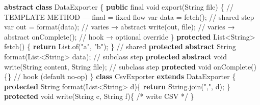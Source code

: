 \documentclass[11pt]{article}
\newenvironment{Shaded}{\begin{snugshade}}{\end{snugshade}}
\newcommand{\BuiltInTok}[1]{\textcolor[rgb]{0.50,0.55,0.55}{#1}}
\newcommand{\CommentTok}[1]{\textcolor[rgb]{0.48,0.49,0.49}{#1}}
\newcommand{\ControlFlowTok}[1]{\textcolor[rgb]{0.99,0.74,0.29}{\textbf{#1}}}
\newcommand{\DataTypeTok}[1]{\textcolor[rgb]{0.16,0.50,0.73}{#1}}
\newcommand{\FunctionTok}[1]{\textcolor[rgb]{0.56,0.27,0.68}{#1}}
\newcommand{\KeywordTok}[1]{\textcolor[rgb]{0.81,0.81,0.76}{\textbf{#1}}}
\newcommand{\NormalTok}[1]{\textcolor[rgb]{0.81,0.81,0.76}{#1}}
\newcommand{\OperatorTok}[1]{\textcolor[rgb]{0.81,0.81,0.76}{#1}}
\newcommand{\StringTok}[1]{\textcolor[rgb]{0.96,0.31,0.31}{#1}}
\begin{document}
\begin{Shaded}
\begin{Highlighting}[]
\KeywordTok{abstract} \KeywordTok{class}\NormalTok{ DataExporter }\OperatorTok{\{}
    \KeywordTok{public} \DataTypeTok{final} \DataTypeTok{void} \FunctionTok{export}\OperatorTok{(}\BuiltInTok{String}\NormalTok{ file}\OperatorTok{)} \OperatorTok{\{}     \CommentTok{// TEMPLATE METHOD — final = fixed flow}
        \DataTypeTok{var}\NormalTok{ data }\OperatorTok{=} \FunctionTok{fetch}\OperatorTok{();}      \CommentTok{// shared step}
        \DataTypeTok{var}\NormalTok{ out  }\OperatorTok{=} \FunctionTok{format}\OperatorTok{(}\NormalTok{data}\OperatorTok{);} \CommentTok{// varies  → abstract}
        \FunctionTok{write}\OperatorTok{(}\NormalTok{out}\OperatorTok{,}\NormalTok{ file}\OperatorTok{);}        \CommentTok{// varies  → abstract}
        \FunctionTok{onComplete}\OperatorTok{();}            \CommentTok{// hook    → optional override}
    \OperatorTok{\}}
    \KeywordTok{protected} \BuiltInTok{List}\OperatorTok{\textless{}}\BuiltInTok{String}\OperatorTok{\textgreater{}} \FunctionTok{fetch}\OperatorTok{()} \OperatorTok{\{} \ControlFlowTok{return} \BuiltInTok{List}\OperatorTok{.}\FunctionTok{of}\OperatorTok{(}\StringTok{"a"}\OperatorTok{,} \StringTok{"b"}\OperatorTok{);} \OperatorTok{\}}   \CommentTok{// shared}
    \KeywordTok{protected} \KeywordTok{abstract} \BuiltInTok{String} \FunctionTok{format}\OperatorTok{(}\BuiltInTok{List}\OperatorTok{\textless{}}\BuiltInTok{String}\OperatorTok{\textgreater{}}\NormalTok{ data}\OperatorTok{);}          \CommentTok{// subclass step}
    \KeywordTok{protected} \KeywordTok{abstract} \DataTypeTok{void}   \FunctionTok{write}\OperatorTok{(}\BuiltInTok{String}\NormalTok{ content}\OperatorTok{,} \BuiltInTok{String}\NormalTok{ file}\OperatorTok{);} \CommentTok{// subclass step}
    \KeywordTok{protected} \DataTypeTok{void} \FunctionTok{onComplete}\OperatorTok{()} \OperatorTok{\{\}}                                 \CommentTok{// hook (default no{-}op)}
\OperatorTok{\}}
\KeywordTok{class}\NormalTok{ CsvExporter }\KeywordTok{extends}\NormalTok{ DataExporter }\OperatorTok{\{}
    \KeywordTok{protected} \BuiltInTok{String} \FunctionTok{format}\OperatorTok{(}\BuiltInTok{List}\OperatorTok{\textless{}}\BuiltInTok{String}\OperatorTok{\textgreater{}}\NormalTok{ d}\OperatorTok{)\{} \ControlFlowTok{return} \BuiltInTok{String}\OperatorTok{.}\FunctionTok{join}\OperatorTok{(}\StringTok{","}\OperatorTok{,}\NormalTok{ d}\OperatorTok{);} \OperatorTok{\}}
    \KeywordTok{protected} \DataTypeTok{void} \FunctionTok{write}\OperatorTok{(}\BuiltInTok{String}\NormalTok{ c}\OperatorTok{,} \BuiltInTok{String}\NormalTok{ f}\OperatorTok{)\{} \CommentTok{/* write CSV */} \OperatorTok{\}}

\end{Highlighting}
\end{Shaded}
\end{document}
